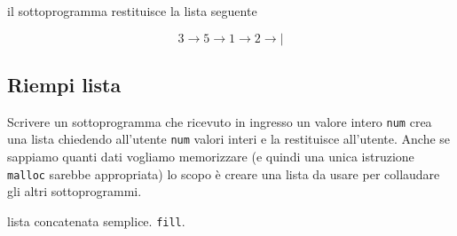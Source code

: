 il sottoprogramma restituisce la lista seguente

$$
3 \rightarrow 5 \rightarrow 1 \rightarrow 2 \rightarrow|
$$ 



\subsection{Riempi lista}
Scrivere un sottoprogramma che ricevuto in ingresso un valore intero \texttt{num} crea una lista chiedendo all'utente \texttt{num} valori interi e la restituisce all'utente. Anche se sappiamo quanti dati vogliamo memorizzare (e quindi una unica istruzione \texttt{malloc} sarebbe appropriata) lo scopo \`e creare una lista da usare per collaudare gli altri sottoprogrammi.

\begin{tags}
lista concatenata semplice. 
\texttt{fill}.
\end{tags}

